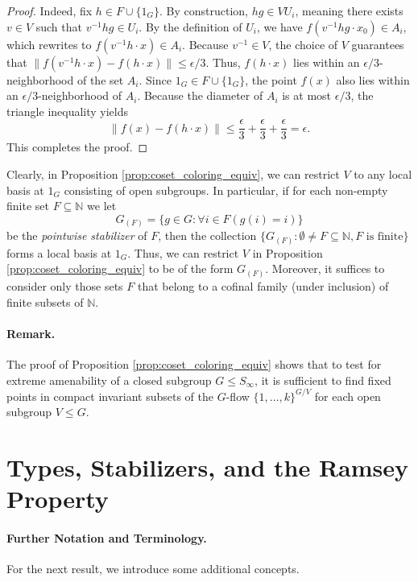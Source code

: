 \begin{proof}
    Indeed, fix $h \in F \cup \{1_G\}$. By construction, $hg \in V U_i$, meaning there exists $v \in V$ such that $v^{-1} h g \in U_i$. By the definition of $U_i$, we have $f(v^{-1} h g \cdot x_0) \in A_i$, which rewrites to $f(v^{-1} h \cdot x) \in A_i$.
    Because $v^{-1} \in V$, the choice of $V$ guarantees that $\|f(v^{-1} h \cdot x) - f(h \cdot x)\| \le \epsilon / 3$. Thus, $f(h \cdot x)$ lies within an $\epsilon / 3$-neighborhood of the set $A_i$.
    Since $1_G \in F \cup \{1_G\}$, the point $f(x)$ also lies within an $\epsilon / 3$-neighborhood of $A_i$. Because the diameter of $A_i$ is at most $\epsilon / 3$, the triangle inequality yields
    $$
        \|f(x) - f(h \cdot x)\| \le \frac{\epsilon}{3} + \frac{\epsilon}{3} + \frac{\epsilon}{3} = \epsilon.
    $$
    This completes the proof.
\end{proof}



Clearly, in Proposition \ref{prop:coset_coloring_equiv}, we can restrict $V$ to any local basis at $1_G$ consisting of open subgroups. In particular, if for each non-empty finite set $F \subseteq \mathbb{N}$ we let
$$
    G_{(F)} = \{g \in G : \forall i \in F(g(i) = i)\}
$$
be the \textit{pointwise stabilizer} of $F$, then the collection $\{G_{(F)} : \emptyset \neq F \subseteq \mathbb{N}, F \text{ is finite}\}$ forms a local basis at $1_G$. Thus, we can restrict $V$ in Proposition \ref{prop:coset_coloring_equiv} to be of the form $G_{(F)}$. Moreover, it suffices to consider only those sets $F$ that belong to a cofinal family (under inclusion) of finite subsets of $\mathbb{N}$.

\paragraph{Remark.}
The proof of Proposition \ref{prop:coset_coloring_equiv} shows that to test for extreme amenability of a closed subgroup $G \le S_\infty$, it is sufficient to find fixed points in compact invariant subsets of the $G$-flow $\{1, \dots, k\}^{G/V}$ for each open subgroup $V \le G$.

\section{Types, Stabilizers, and the Ramsey Property}
\label{sec:ramsey_property}

\paragraph{Further Notation and Terminology.}
For the next result, we introduce some additional concepts.

